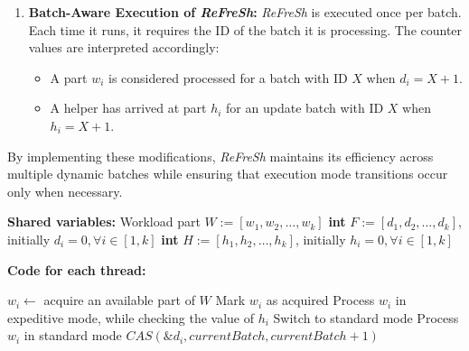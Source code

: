 {\begin{enumerate}
    \item \textbf{Batch-Aware Execution of \textit{ReFreSh}:}  
    \textit{ReFreSh} is executed once per batch. Each time it runs, it requires the ID of the
    batch it is processing. The counter values are interpreted accordingly:  
    \begin{itemize}  
        \item A part $w_i$ is considered processed for a batch with ID $X$ when $d_i = X + 1$.  
        \item A helper has arrived at part $h_i$ for an update batch with ID $X$ when $h_i = X + 1$.  
    \end{itemize}  
\end{enumerate}  

By implementing these modifications, \textit{ReFreSh} maintains its efficiency across
multiple dynamic batches while ensuring that execution mode transitions occur only when necessary.



\begin{algorithm}[htbp]
    \footnotesize
    \vspace*{2mm}
    
    \begin{algorithmic}[1]
    
    \State \textbf{Shared variables:}
    \State Workload part $\mathit{W} := \mathit{[w_1, w_2, \ldots, w_k]}$ \label{alg:DRefresh:w}
    \State \textbf{int} $\mathit{F} := \mathit{[d_1, d_2, \ldots, d_k]}$, initially $\mathit{d_i} = 0, \forall i \in [1, k]$ \label{alg:DRefresh:d}
    \State \textbf{int} $\mathit{H} := \mathit{[h_1, h_2, \ldots, h_k]}$, initially $\mathit{h_i} = 0, \forall i \in [1, k]$ \label{alg:DRefresh:h}
    
    \vspace*{1mm}
    \State \textbf{Code for each thread:}
    
         \label{alg:DRefresh:process:start}
            \State $\mathit{w_i} \gets$ acquire an available part of $\mathit{W}$
            \State Mark $\mathit{w_i}$ as acquired
             \label{alg:DRefresh:process:if}
                \State Process $\mathit{w_i}$ in expeditive mode, while checking the value of $h_i$ \label{alg:DRefresh:process:expeditive}
                    \State Switch to standard mode
                \EndIf
            \Else
                \State Process $\mathit{w_i}$ in standard mode   \label{alg:DRefresh:process:standard}
            \EndIf
                \State $\mathit{CAS(\&d_i, currentBatch, currentBatch+1)}$ \label{alg:DRefresh:d:increase}
            \EndIf
        \EndWhile
        

\end{algorithmic}
\end{algorithm}}
